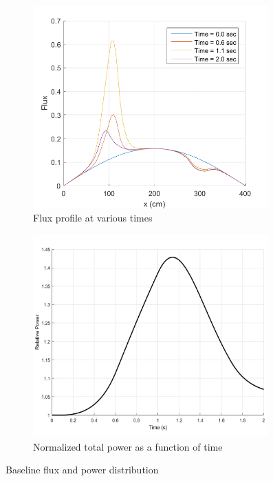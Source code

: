 \documentclass{elsarticle}
\begin{document}
\begin{figure}[!htbp]
\centering
\begin{subfigure}[b]{0.49\textwidth}
\centering
\includegraphics[width=0.99\textwidth]{figures/1D_flux.png}
\caption{Flux profile at various times}
\label{fig:1D_flux}
\end{subfigure}
\begin{subfigure}[b]{0.49\textwidth}
\centering
\includegraphics[width=0.99\textwidth]{figures/1D_power_base.png}
\caption{Normalized total power as a function of time}
\label{fig:1D_tot_power}
\end{subfigure}
\caption{Baseline flux and power distribution}
\label{fig:1D}
\end{figure}
\end{document}

